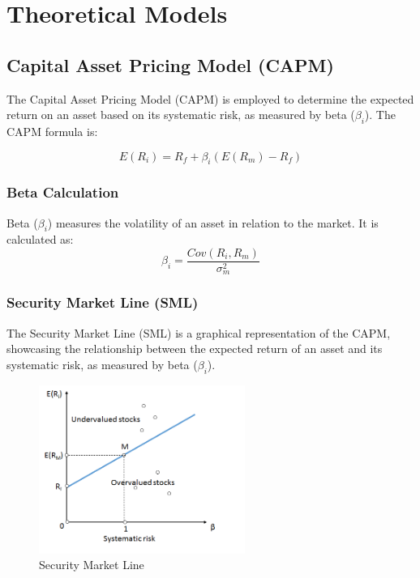 \section{Theoretical Models}

\subsection{Capital Asset Pricing Model (CAPM)}
The Capital Asset Pricing Model (CAPM) is employed to determine the expected return on an asset based on its systematic risk, as measured by beta ($\beta_i$). The CAPM formula is:

\begin{equation}
E(R_i) = R_f + \beta_i(E(R_m) - R_f)
\end{equation}

\subsubsection{Beta Calculation}
Beta ($\beta_i$) measures the volatility of an asset in relation to the market. It is calculated as:
\begin{equation}
\beta_i = \frac{Cov(R_i, R_m)}{\sigma^2_m}
\end{equation}

\subsubsection{Security Market Line (SML)}
The Security Market Line (SML) is a graphical representation of the CAPM, showcasing the relationship between the expected return of an asset and its systematic risk, as measured by beta ($\beta_i$).

\begin{figure}[h!]
    \centering
    \includegraphics[width=0.6\textwidth]{../Figures/SML.png}
    \caption{Security Market Line}
    \label{fig:SML}
\end{figure}

